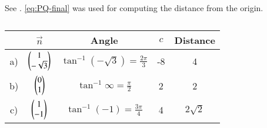   See .
			\eqref{eq:PQ-final} was used for computing the distance from the origin.
			\begin{table}[!htbp]
  \centering
  \begin{tabular}{|c|c|c|c|c|}
    \hline
    & $\vec{n}$ & Angle & $c$& Distance \\
    \hline
    a) & $\begin{pmatrix}1 \\ -\sqrt{3}\end{pmatrix}$ & $\tan^{-1}(-\sqrt{3}) = \frac{2\pi}{3}$ &-8 & 4 \\
    \hline
    b) & $\begin{pmatrix}0 \\ 1\end{pmatrix}$ & $\tan^{-1}\infty = \frac{\pi}{2}$ &2 & 2 \\
    \hline
    c) & $\begin{pmatrix}1 \\ -1\end{pmatrix}$ & $\tan^{-1}(-1) = \frac{3\pi}{4}$ &4 & $2\sqrt{2}$ \\
    \hline
  \end{tabular}
  \caption{}
  \label{tab:11/10/3/3}
\end{table}

